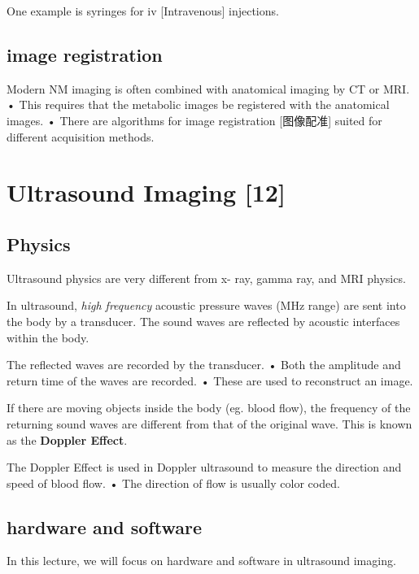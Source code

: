 \documentclass[UTF8,a4paper,11pt]{book}
\theoremstyle{mystyle}{
  \newtheorem{example}{Example}
}
\begin{document}
One example is syringes for iv [Intravenous] injections.

\section{image registration}
Modern NM imaging is often combined with
anatomical imaging by CT or MRI.
• This requires that the metabolic images be
registered with the anatomical images.
• There are algorithms for image registration [图像配准]
suited for different acquisition methods.





\chapter{Ultrasound Imaging [12]}

\section{Physics}
Ultrasound physics are very different from x-
ray, gamma ray, and MRI physics.

 In ultrasound, \emph{high frequency} acoustic
pressure waves (MHz range) are sent into the
body by a transducer.
 The sound waves are reflected by acoustic
interfaces within the body.

The reflected waves
are recorded by the
transducer.
• Both the amplitude
and return time of
the waves are
recorded.
• These are used to
reconstruct an
image.

 If there are moving objects inside the body
(eg. blood flow), the frequency of the
returning sound waves are different from that
of the original wave. This is known as the \textbf{Doppler Effect}.

The Doppler Effect is used in Doppler
ultrasound to measure the direction and
speed of blood flow.
• The direction of flow is usually color coded.

\section{hardware and
software}
In this lecture, we will focus on hardware and
software in ultrasound imaging.
\end{document}

